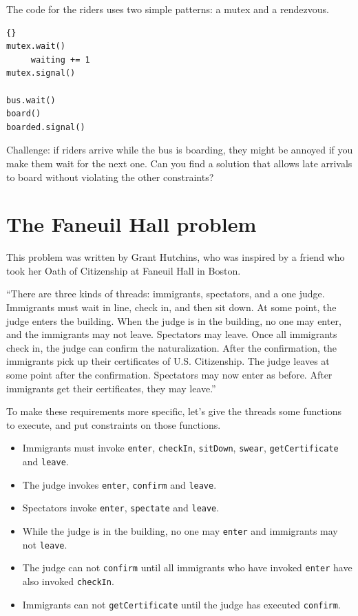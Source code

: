 \documentclass{book}
\newcommand{\clearemptydoublepage}{\newpage\cleardoublepage}
\begin{document}
The code for the riders uses two
simple patterns: a mutex and a rendezvous.

\begin{lstlisting}[caption={Bus problem solution (riders)}]{}
mutex.wait()
     waiting += 1
mutex.signal()

bus.wait()
board()
boarded.signal()
\end{lstlisting}

Challenge: if riders arrive while the bus is boarding, they
might be annoyed if you make them wait for the next one.  Can you
find a solution that allows late arrivals to board without violating
the other constraints?


\clearemptydoublepage
\section{The Faneuil Hall problem}

This problem was written by Grant Hutchins, who was inspired
by a friend who took her
Oath of Citizenship at Faneuil Hall in Boston.

``There are three kinds of threads: immigrants, spectators, and a one
judge.  Immigrants must wait in line, check in, and then sit down.  At
some point, the judge enters the building.  When the judge is in the
building, no one may enter, and the immigrants may not leave.
Spectators may leave.  Once all immigrants check in, the judge can
confirm the naturalization.  After the confirmation, the immigrants
pick up their certificates of U.S. Citizenship.  The judge leaves at
some point after the confirmation.  Spectators may now enter as
before.  After immigrants get their certificates, they may leave.''

To make these requirements more specific, let's give the threads
some functions to execute, and put constraints on those functions.

\begin{itemize}

\item Immigrants must invoke {\tt enter}, {\tt checkIn}, {\tt sitDown},
{\tt swear}, {\tt getCertificate} and {\tt leave}.

\item The judge invokes {\tt enter}, {\tt confirm} and {\tt leave}.

\item Spectators invoke {\tt enter}, {\tt spectate} and {\tt leave}.

\item While the judge is in the building, no one may {\tt enter}
and immigrants may not {\tt leave}.

\item The judge can not {\tt confirm} until all immigrants who have
invoked {\tt enter} have also invoked {\tt checkIn}.

\item Immigrants can not {\tt getCertificate} until the judge
has executed {\tt confirm}.

\end{itemize}
\end{document}
